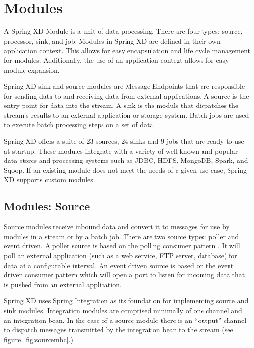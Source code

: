 \section{Modules}
\label{sec:Modules}
A Spring XD Module is a unit of data processing. There are four
types: source, processor, sink, and job. Modules in Spring XD are defined in their
own application context. This allows for easy encapsulation and life cycle management
for modules. Additionally, the use of an application context allows for easy module
expansion.

Spring XD sink and source modules are Message Endpoints 
\cite{enterprise-integration-pattern-message-endpoint} 
that are responsible for sending data to and receiving data from external applications.
A source is the entry point for data into the stream. A sink is the module that dispatches
the stream's results to an external application or storage system. Batch jobs are used to
execute batch processing steps on a set of data.

\par

Spring XD offers a suite of 23 sources, 24 sinks and 9 jobs that are ready to use at startup.
These modules integrate with a variety of well known and popular data stores
and processing systems such as JDBC, HDFS, MongoDB, Spark, and Sqoop.
If an existing module does not meet the needs of a given use case, Spring XD supports custom
modules.

\par

\subsection{Modules: Source}
Source modules receive inbound data and convert it to messages for
use by modules in a stream or by a batch job.
There are two source types: poller and event driven.  A poller source is based on the polling
consumer pattern \cite{enterprise-integration-pattern-pollingconsumer}. It
will poll an external application (such as a web service, FTP server, database) for data at a
configurable interval. An event driven source is based on the event driven
consumer pattern \cite{enterprise-integration-pattern-eventdrivenconsumer} which will
open a port to listen for incoming data that is pushed from an external application.

\par

Spring XD uses Spring Integration \cite{spring-integration-reference} as its foundation
for implementing source and sink modules. Integration modules are
comprised minimally of one channel and an integration bean.  In the case of a source module
there is an ``output'' channel to dispatch messages transmitted by the integration bean to
the stream (see figure~\ref{fig:sourcembc}.)

